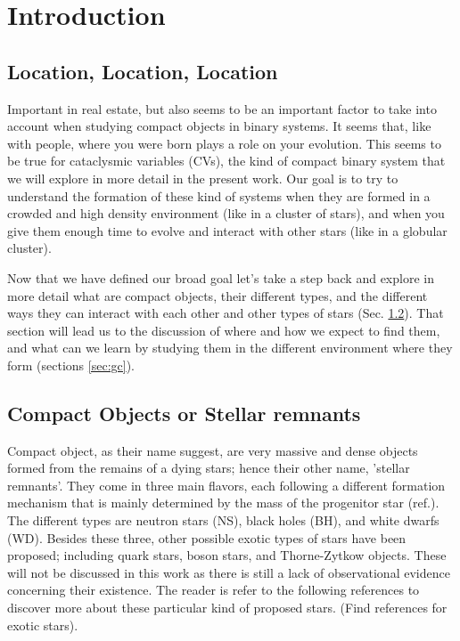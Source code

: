 \chapter{Introduction}
\thispagestyle{fancy}

\section{Location, Location, Location}

Important in real estate, but also seems to be an important factor to take into account when studying compact objects in binary systems. It seems that, like with people, where you were born plays a role on your evolution. This seems to be true for cataclysmic variables (CVs), the kind of compact binary system that we will explore in more detail in the present work. Our goal is to try to understand the formation of these kind of systems when they are formed in a crowded and high density environment (like in a cluster of stars), and when you give them enough time to evolve and interact with other stars (like in a globular cluster).  

Now that we have defined our broad goal let's take a step back and explore in more detail what are compact objects, their different types, and the different ways they can interact with each other and other types of stars (Sec. \ref{sec:co}). That section will lead us to the discussion of where and how we expect to find them, and what can we learn by studying them in the different environment where they form (sections \ref{sec:gc}).

\section{Compact Objects or Stellar remnants}\label{sec:co}

Compact object, as their name suggest, are very massive and dense objects formed from the remains of a dying stars; hence their other name, 'stellar remnants'. They come in three main flavors, each following a different formation mechanism that is mainly determined by the mass of the progenitor star (ref.). The different types are neutron stars (NS), black holes (BH), and white dwarfs (WD). Besides these three, other possible exotic types of stars have been proposed; including quark stars, boson stars, and Thorne-Zytkow objects. These will not be discussed in this work as there is still a lack of observational evidence concerning their existence. The reader is refer to the following references to discover more about these particular kind of proposed stars. (Find references for exotic stars). 

